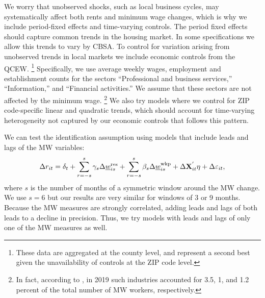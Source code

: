 We worry that unobserved shocks, such as local business cycles, may 
systematically affect both rents and minimum wage changes, which is why
we include period-fixed effects and time-varying controls.
The period fixed effects should capture common trends in the housing market.
In some specifications we allow this trends to vary by CBSA.
To control for variation arising from unobserved trends in local markets we 
include economic controls from the QCEW.%
\footnote{These data are aggregated at the county level, and represent a second best given the 
unavailability of controls at the ZIP code level.}
Specifically, we use average weekly wages, employment and establishment counts 
for the sectors ``Professional and business services,'' ``Information,'' and 
``Financial activities.''
We assume that these sectors are not affected by the minimum wage.%
\footnote{In fact, according to \textcite[][table 5]{MinWorkersReportBLS}, in 
2019 such industries accounted for 3.5, 1, and 1.2 percent of the total number 
of MW workers, respectively.}
We also try models where we control for ZIP code-specific linear and quadratic 
trends, which should account for time-varying heterogeneity not captured by our 
economic controls that follows this pattern.

We can test the identification assumption using models that include leads and lags
of the MW variables:
\begin{equation} \label{eq:leads_lags}
    \Delta r_{it} = \delta_t
                  + \sum_{r=-s}^{s} \gamma_s \Delta \underline{w}^{\text{res}}_{is} 
                  + \sum_{r=-s}^{s} \beta_s \Delta \underline{w}^{\text{wkp}}_{is}
                  + \Delta \mathbf{X}^{'}_{it}\eta
                  + \Delta \varepsilon_{it} ,
\end{equation}
where $s$ is the number of months of a symmetric window around the MW change. 
We use $s=6$ but our results are very similar for windows of 3 or 9 months.
Because the MW measures are strongly correlated, adding leads and lags of both 
leads to a decline in precision.
Thus, we try models with leads and lags of only one of the MW measures as well.

